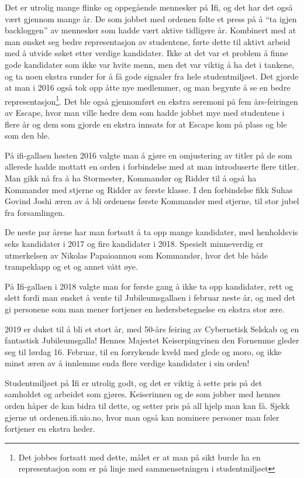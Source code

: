 Det er utrolig mange flinke og oppegående mennesker på Ifi, og det har det også vært gjennom mange år. De som jobbet med ordenen følte et press på å ``ta igjen backloggen'' av mennesker som hadde vært aktive tidligere år. Kombinert med at man ønsket seg bedre representasjon av studentene, førte dette til aktivt arbeid med å utvide søket etter verdige kandidater. Ikke at det var et problem å finne gode kandidater som ikke var hvite menn, men det var viktig å ha det i tankene, og ta noen ekstra runder for å få gode signaler fra hele studentmiljøet. Det gjorde at man i 2016 også tok opp åtte nye medlemmer, og man begynte å se en bedre representasjon\footnote{Det jobbes fortsatt med dette, målet er at man på sikt burde ha en representasjon som er på linje med sammensetningen i studentmiljøet}. Det ble også gjennomført en ekstra seremoni på fem års-feiringen av Escape, hvor man ville hedre dem som hadde jobbet mye med studentene i flere år og dem som gjorde en ekstra innsats for at Escape kom på plass og ble som den ble. 

På ifi-gallaen høsten 2016 valgte man å gjøre en omjustering av titler på de som allerede hadde mottatt en orden i forbindelse med at man introduserte flere titler. Man gikk nå fra å ha Stormester, Kommandør og Ridder til å også ha Kommandør med stjerne og Ridder av første klasse. I den forbindelse fikk Suhas Govind Joshi æren av å bli ordenens første Kommandør med stjerne, til stor jubel fra forsamlingen.

De neste par årene har man fortsatt å ta opp mange kandidater, med henholdsvis seks kandidater i 2017 og fire kandidater i 2018. Spesielt minneverdig er utmerkelsen av Nikolas Papaioannou som Kommandør, hvor det ble både trampeklapp og et og annet vått øye. 

På Ifi-gallaen i 2018 valgte man for første gang å ikke ta opp kandidater, rett og slett fordi man ønsket å vente til Jubileumsgallaen i februar neste år, og med det gi personene som man mener fortjener en hedersbetegnelse en ekstra stor ære.

2019 er duket til å bli et stort år, med 50-års feiring av Cybernetisk Selskab og en fantastisk Jubileumsgalla! Hennes Majestet Keiserpingvinen den Fornemme gleder seg til lørdag 16. Februar, til en forrykende kveld med glede og moro, og ikke minst æren av å innlemme enda flere verdige kandidater i sin orden!

Studentmiljøet på Ifi er utrolig godt, og det er viktig å sette pris på det samholdet og arbeidet som gjøres. Keiserinnen og de som jobber med hennes orden håper de kan bidra til dette, og setter pris på all hjelp man kan få. Sjekk gjerne ut ordenen.ifi.uio.no, hvor man også kan nominere personer man føler fortjener en ekstra heder.

